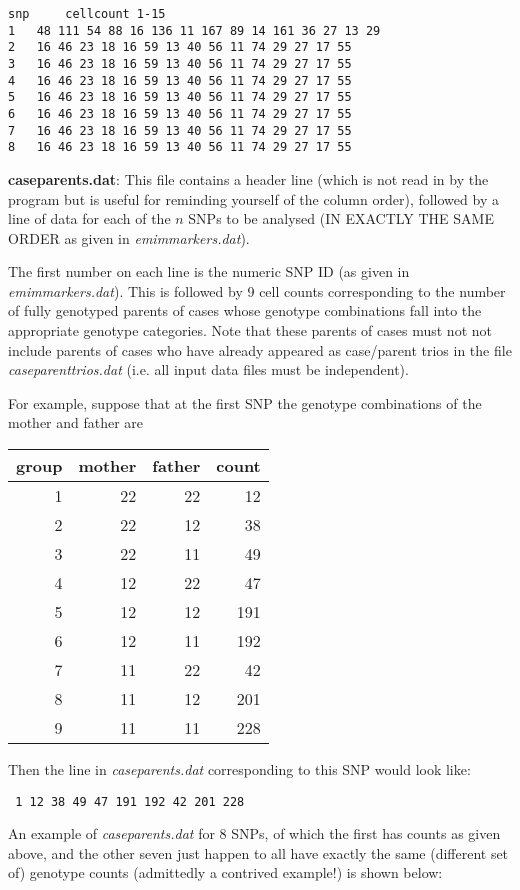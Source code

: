 \documentclass[a4paper,11pt]{report}
\begin{document}
\begin{verbatim}
snp 	cellcount 1-15
1 	48 111 54 88 16 136 11 167 89 14 161 36 27 13 29
2 	16 46 23 18 16 59 13 40 56 11 74 29 27 17 55
3 	16 46 23 18 16 59 13 40 56 11 74 29 27 17 55
4 	16 46 23 18 16 59 13 40 56 11 74 29 27 17 55
5 	16 46 23 18 16 59 13 40 56 11 74 29 27 17 55
6 	16 46 23 18 16 59 13 40 56 11 74 29 27 17 55
7 	16 46 23 18 16 59 13 40 56 11 74 29 27 17 55
8 	16 46 23 18 16 59 13 40 56 11 74 29 27 17 55
\end{verbatim}
 \bigskip

	{\bf  caseparents.dat}: This file contains a header line
(which is not read in by the program but is useful for reminding
yourself of the  column order), followed by a line of data
for each of the $n$ SNPs to be analysed (IN EXACTLY THE SAME ORDER
as given in {\it emimmarkers.dat}).

The first number on each line is the numeric SNP ID (as given in {\it emimmarkers.dat}). This is followed by 9 cell counts corresponding to the number
of fully genotyped parents of cases whose genotype combinations
 fall into the appropriate genotype categories. Note that these
 parents of cases must not not include parents of cases
who have already appeared as case/parent trios in the file 	
{\it  caseparenttrios.dat} (i.e. all input data files must be
independent).


For example, suppose that at the first SNP the genotype combinations of the mother and father are

\begin{tabular}{rrrr} 
group    &   mother &father   &count \\ \hline
1 &22 &22 &12\\
2 &22 &12 &38\\
3 &22 &11 &49\\
4 &12 &22 &47\\
5 &12 &12       &191\\
6 &12 &11       &192\\
7 &11 &22 &42\\
8 &11 &12       &201\\
9 &11 &11       &228\\
\end{tabular}

Then the line in	{\it  caseparents.dat} corresponding to this SNP 
would look like:

{\tt
1 	12 38 49 47 191 192 42 201 228
}

An example of {\it  caseparents.dat} for 8 SNPs, of which the first has counts as given above, and the other seven just happen to all have exactly the same (different set of) genotype counts (admittedly a contrived example!) is shown below:\newpage
\end{document}
